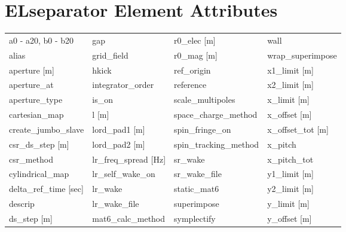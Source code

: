  \section{ELseparator Element Attributes}
 \label{s:list.elseparator}
 
 \begin{tabular}{llll} \toprule
a0 - a20, b0 - b20               & gap                              & r0_elec [m]                      & wall                             \\
alias                            & grid_field                       & r0_mag [m]                       & wrap_superimpose                 \\
aperture [m]                     & hkick                            & ref_origin                       & x1_limit [m]                     \\
aperture_at                      & integrator_order                 & reference                        & x2_limit [m]                     \\
aperture_type                    & is_on                            & scale_multipoles                 & x_limit [m]                      \\
cartesian_map                    & l [m]                            & space_charge_method              & x_offset [m]                     \\
create_jumbo_slave               & lord_pad1 [m]                    & spin_fringe_on                   & x_offset_tot [m]                 \\
csr_ds_step [m]                  & lord_pad2 [m]                    & spin_tracking_method             & x_pitch                          \\
csr_method                       & lr_freq_spread [Hz]              & sr_wake                          & x_pitch_tot                      \\
cylindrical_map                  & lr_self_wake_on                  & sr_wake_file                     & y1_limit [m]                     \\
delta_ref_time [sec]             & lr_wake                          & static_mat6                      & y2_limit [m]                     \\
descrip                          & lr_wake_file                     & superimpose                      & y_limit [m]                      \\
ds_step [m]                      & mat6_calc_method                 & symplectify                      & y_offset [m]                     \\

\end{tabular}
